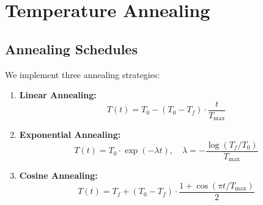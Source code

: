 \documentclass[12pt,a4paper]{article}
\begin{document}
\section{Temperature Annealing}

\subsection{Annealing Schedules}

We implement three annealing strategies:

\begin{enumerate}[label=\textbf{\arabic*.}, leftmargin=1.5cm]
\item \textbf{Linear Annealing:}
    \begin{equation}
    T(t) = T_0 - (T_0 - T_f) \cdot \frac{t}{T_{\max}}
    \end{equation}
    
\item \textbf{Exponential Annealing:}
    \begin{equation}
    T(t) = T_0 \cdot \exp(-\lambda t), \quad \lambda = -\frac{\log(T_f/T_0)}{T_{\max}}
    \end{equation}
    
\item \textbf{Cosine Annealing:}
    \begin{equation}
    T(t) = T_f + (T_0 - T_f) \cdot \frac{1 + \cos(\pi t/T_{\max})}{2}
    \end{equation}
\end{enumerate}
\end{document}
